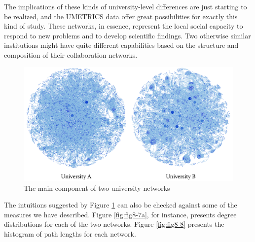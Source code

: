 \documentclass[]{krantz}
\begin{document}
The implications of these kinds of university-level differences are just
starting to be realized, and the UMETRICS data offer great possibilities
for exactly this kind of study. These networks, in essence, represent
the local social capacity to respond to new problems and to develop
scientific findings. Two otherwise similar institutions might have quite
different capabilities based on the structure and composition of their
collaboration networks.

\begin{figure}

{\centering \includegraphics[width=0.7\linewidth]{ChapterNetworks/figures/fig8-6} 

}

\caption{The main component of two university networks}\label{fig:fig8-6}
\end{figure}

The intuitions suggested by Figure \ref{fig:fig8-6} can also be checked
against some of the measures we have described. Figure
\ref{fig:fig8-7a}, for instance, presents degree distributions for each
of the two networks. Figure \ref{fig:fig8-8} presents the histogram of
path lengths for each network.
\end{document}
